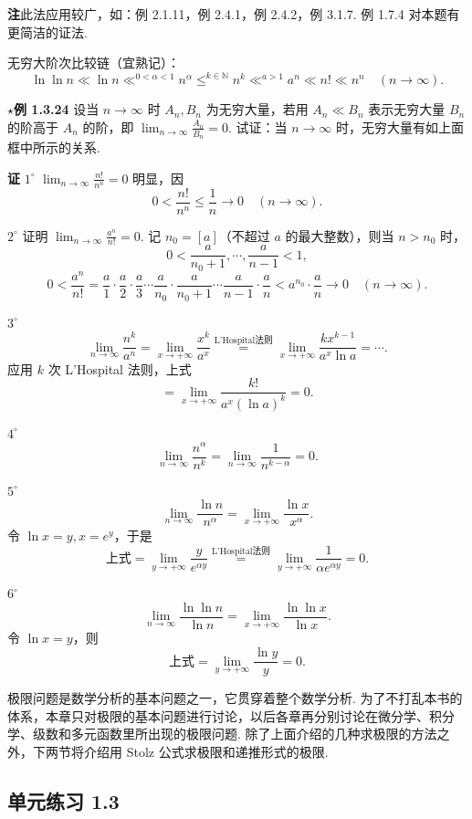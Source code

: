 \documentclass[UTF8, 12pt, fontset=fandol, oneside]{ctexart}
\begin{document}
\noindent\textbf{注}\quad 此法应用较广，如：例 2.1.11，例 2.4.1，例 2.4.2，例 3.1.7.
例 1.7.4 对本题有更简洁的证法.

无穷大阶次比较链（宜熟记）：
\[
  \boxed{\ln\ln n\ll \ln n \mathop{\ll}^{0<\alpha<1} n^\alpha
  \mathop{\le}^{k\in\mathbb N} n^k
  \mathop{\ll}^{a>1} a^n\ll n!\ll n^n\quad(n\to\infty).}
\]

\noindent\textbf{$\star$例 1.3.24}\quad
设当 $n\to\infty$ 时 $A_n,B_n$ 为无穷大量，若用 $A_n\ll B_n$ 表示无穷大量 $B_n$ 的阶高于 $A_n$ 的阶，即
$\displaystyle\lim_{n\to\infty}\frac{A_n}{B_n}=0$. 试证：当 $n\to\infty$ 时，无穷大量有如上面框中所示的关系.

\noindent\textbf{证}\quad
$1^\circ$ $\displaystyle\lim_{n\to\infty}\frac{n!}{n^n}=0$ 明显，因
\[
  0<\frac{n!}{n^n}\le\frac1n\to0\quad(n\to\infty).
\]

$2^\circ$ 证明 $\displaystyle\lim_{n\to\infty}\frac{a^n}{n!}=0$. 记 $n_0=[a]$（不超过 $a$ 的最大整数），则当 $n>n_0$ 时，
\[
  0<\frac a{n_0+1},\cdots,\frac a{n-1}<1,
\]
\[
  0<\frac{a^n}{n!}
  =\frac a1\cdot\frac a2\cdot\frac a3\cdots
  \frac a{n_0}\cdot\frac a{n_0+1}\cdots
  \frac a{n-1}\cdot\frac an
  <a^{n_0}\cdot\frac an\to0\quad(n\to\infty).
\]

$3^\circ$
\[
  \lim_{n\to\infty}\frac{n^k}{a^n}
  =\lim_{x\to+\infty}\frac{x^k}{a^x}
  \overset{\text{L'Hospital法则}}{=}
  \lim_{x\to+\infty}\frac{kx^{k-1}}{a^x\ln a}=\cdots.
\]
应用 $k$ 次 L'Hospital 法则，上式
\[
  =\lim_{x\to+\infty}\frac{k!}{a^x(\ln a)^k}=0.
\]

$4^\circ$
\[
  \lim_{n\to\infty}\frac{n^\alpha}{n^k}
  =\lim_{n\to\infty}\frac1{n^{k-\alpha}}=0.
\]

$5^\circ$
\[
  \lim_{n\to\infty}\frac{\ln n}{n^\alpha}
  =\lim_{x\to+\infty}\frac{\ln x}{x^\alpha}.
\]
令 $\ln x=y,x=e^y$，于是
\[
  \text{上式}=\lim_{y\to+\infty}\frac{y}{e^{\alpha y}}
  \overset{\text{L'Hospital法则}}{=}
  \lim_{y\to+\infty}\frac1{\alpha e^{\alpha y}}=0.
\]

$6^\circ$
\[
  \lim_{n\to\infty}\frac{\ln\ln n}{\ln n}
  =\lim_{x\to+\infty}\frac{\ln\ln x}{\ln x}.
\]
令 $\ln x=y$，则
\[
  \text{上式}=\lim_{y\to+\infty}\frac{\ln y}{y}=0.
\]

极限问题是数学分析的基本问题之一，它贯穿着整个数学分析. 为了不打乱本书的体系，本章只对极限的基本问题进行讨论，以后各章再分别讨论在微分学、积分学、级数和多元函数里所出现的极限问题. 除了上面介绍的几种求极限的方法之外，下两节将介绍用 Stolz 公式求极限和递推形式的极限.

\subsection*{单元练习 1.3}
\end{document}
